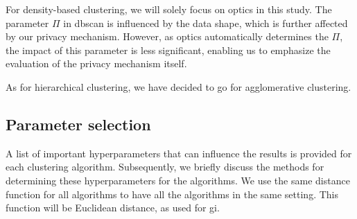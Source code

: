 For density-based clustering, we will solely focus on \gls{optics} in this study.
The parameter $\Pi$ in \gls{dbscan} is influenced by the data shape, which is further affected by our privacy mechanism.
However, as \gls{optics} automatically determines the $\Pi$, the impact of this parameter is less significant, enabling us to emphasize the evaluation of the privacy mechanism itself.

As for hierarchical clustering, we have decided to go for agglomerative clustering.


\subsection{Parameter selection}
A list of important hyperparameters that can influence the results is provided for each clustering algorithm.
Subsequently, we briefly discuss the methods for determining these hyperparameters for the algorithms. \newline
We use the same distance function for all algorithms to have all the algorithms in the same setting.
This function will be Euclidean distance, as used for \gls{gi}.
